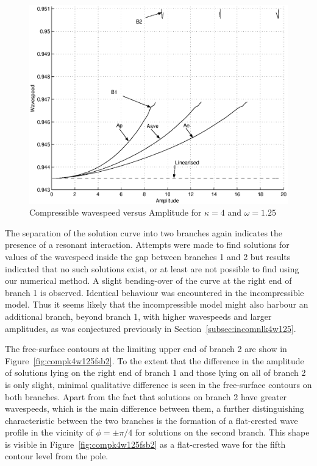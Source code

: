 \begin{figure}[htbp]
	\centering
		\includegraphics[scale=0.75]{IMAGES/CvsAk4w125com.eps}
	\caption{Compressible wavespeed versus Amplitude for $\kappa=4$ and $\omega=1.25$}
	\label{fig:CvsAk4w125com}
\end{figure}

The separation of the solution curve into two branches again indicates the presence of a resonant interaction. Attempts were made to find solutions for values of the wavespeed inside the gap between branches 1 and 2 but results indicated that no such solutions exist, or at least are not possible to find using our numerical method. A slight bending-over of the curve at the right end of branch 1 is observed. Identical behaviour was encountered in the incompressible model. Thus it seems likely that the incompressible model might also harbour an additional branch, beyond branch 1, with higher wavespeeds and larger amplitudes, as was conjectured previously in Section~\ref{subsec:incomnlk4w125}.

The free-surface contours at the limiting upper end of branch 2 are show in Figure~\ref{fig:compk4w125fsb2}. To the extent that the difference in the amplitude of solutions lying on the right end of branch 1 and those lying on all of branch 2 is only slight, minimal qualitative difference is seen in the free-surface contours on both branches. Apart from the fact that solutions on branch 2 have greater wavespeeds, which is the main difference between them, a further distinguishing characteristic between the two branches is the formation of a flat-crested wave profile in the vicinity of $\phi=\pm \pi/4$ for solutions on the second branch. This shape is visible in Figure~\ref{fig:compk4w125fsb2} as a flat-crested wave for the fifth contour level from the pole. 


